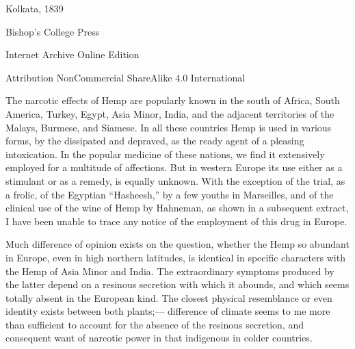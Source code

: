 \documentclass[a4paper, 11pt, oneside, polutonikogreek, english]{article}
\begin{document}
\begin{titlepage}
	
	
		
	\vspace*{\fill}%
	
	
	{Kolkata, 1839} %
 
        {\small Bishop's College Press}

	\vspace{1\baselineskip} %

        Internet Archive Online Edition  %
	
	{\small Attribution NonCommercial ShareAlike 4.0 International } %
\end{titlepage}
\clearpage
\setlength{\parskip}{1mm plus1mm minus1mm}
\tableofcontents
\clearpage
The narcotic effects of Hemp are popularly known in the south of Africa, South America, Turkey, Egypt, Asia Minor, India, and the adjacent territories of the Malays, Burmese, and Siamese. In all these countries Hemp is used in various forms, by the dissipated and depraved, as the ready agent of a pleasing intoxication. In the popular medicine of these nations, we find it extensively employed for a multitude of affections. But in western Europe its use either as a stimulant or as a remedy, is equally unknown. With the exception of the trial, as a frolic, of the Egyptian ``Hasheesh,'' by a few youths in Marseilles, and of the clinical use of the wine of Hemp by Hahneman, as shown in a subsequent extract, I have been unable to trace any notice of the employment of this drug in Europe.

Much difference of opinion exists on the question, whether the Hemp so abundant in Europe, even in high northern latitudes, is identical in specific characters with the Hemp of Asia Minor and India. The extraordinary symptoms produced by the latter depend on a resinous secretion with which it abounds, and which seems totally absent in the European kind. The closest physical resemblance or even identity exists between both plants;--- difference of climate seems to me more than sufficient to account for the absence of the resinous secretion, and consequent want of narcotic power in that indigenous in colder countries.
\end{document}

